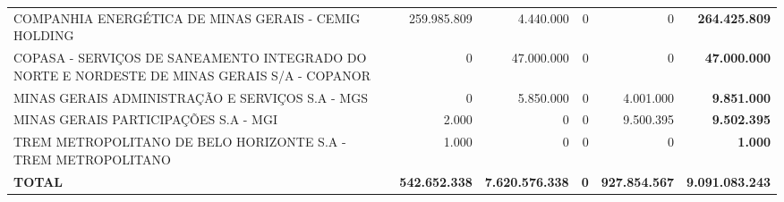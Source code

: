 \documentclass{article}
\begin{document}
\begin{longtable}[c]{m{5.5cm}|m{2.5cm}|m{2.5cm}|m{2.5cm}|m{2cm}|m{2cm}}
\multicolumn{1}{L{5.5cm}|}{COMPANHIA ENERGÉTICA DE MINAS GERAIS - CEMIG HOLDING} & \multicolumn{1}{r|}{259.985.809} & \multicolumn{1}{r|}{4.440.000} & \multicolumn{1}{r|}{0} & \multicolumn{1}{r|}{          0} & \multicolumn{1}{r}{ \textbf{264.425.809}} \\
\multicolumn{1}{L{5.5cm}|}{COPASA - SERVIÇOS DE SANEAMENTO INTEGRADO DO NORTE E NORDESTE DE MINAS GERAIS S/A - COPANOR} & \multicolumn{1}{r|}{          0} & \multicolumn{1}{r|}{47.000.000} & \multicolumn{1}{r|}{0} & \multicolumn{1}{r|}{          0} & \multicolumn{1}{r}{ \textbf{47.000.000}} \\
\multicolumn{1}{L{5.5cm}|}{MINAS GERAIS ADMINISTRAÇÃO E SERVIÇOS S.A - MGS} & \multicolumn{1}{r|}{          0} & \multicolumn{1}{r|}{5.850.000} & \multicolumn{1}{r|}{0} & \multicolumn{1}{r|}{4.001.000} & \multicolumn{1}{r}{ \textbf{9.851.000}} \\
\multicolumn{1}{L{5.5cm}|}{MINAS GERAIS PARTICIPAÇÕES S.A - MGI} & \multicolumn{1}{r|}{2.000} & \multicolumn{1}{r|}{            0} & \multicolumn{1}{r|}{0} & \multicolumn{1}{r|}{9.500.395} & \multicolumn{1}{r}{ \textbf{9.502.395}} \\
\multicolumn{1}{L{5.5cm}|}{TREM METROPOLITANO DE BELO HORIZONTE S.A - TREM METROPOLITANO} & \multicolumn{1}{r|}{1.000} & \multicolumn{1}{r|}{            0} & \multicolumn{1}{r|}{0} & \multicolumn{1}{r|}{          0} & \multicolumn{1}{r}{ \textbf{1.000}} \\
\hline
\multicolumn{1}{L{5.5cm}|}{ \textbf{TOTAL}} & \multicolumn{1}{r|}{ \textbf{542.652.338}} & \multicolumn{1}{r|}{ \textbf{7.620.576.338}} & \multicolumn{1}{r|}{ \textbf{0}} & \multicolumn{1}{r|}{ \textbf{927.854.567}} & \multicolumn{1}{r}{ \textbf{9.091.083.243}} \\\end{longtable}
\end{document}
